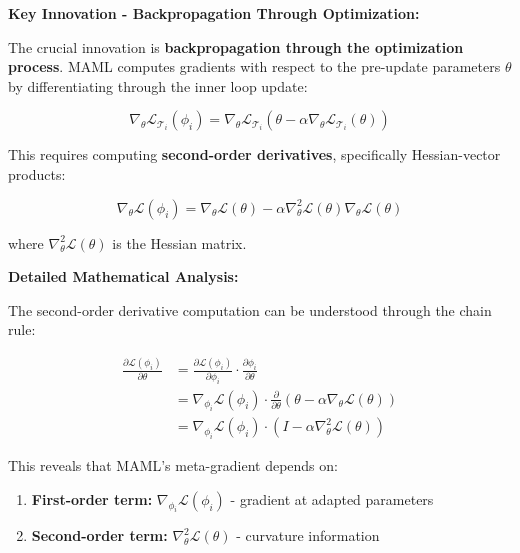 \documentclass[12pt]{article}
\newcommand{\ieee}[1]{\textcolor{IEEEBlue}{\textbf{#1}}}
\newcommand{\highlight}[1]{\textcolor{IEEERed}{\textbf{#1}}}
\begin{document}
{{			\ieee{Key Innovation - Backpropagation Through Optimization:}
			
			The crucial innovation is \highlight{backpropagation through the optimization process}. MAML computes gradients with respect to the pre-update parameters $\theta$ by differentiating through the inner loop update:
			
			\begin{equation}
			\nabla_\theta \mathcal{L}_{\mathcal{T}_i}(\phi_i) = \nabla_\theta \mathcal{L}_{\mathcal{T}_i}(\theta - \alpha \nabla_\theta \mathcal{L}_{\mathcal{T}_i}(\theta))
			\end{equation}
			
			This requires computing \textbf{second-order derivatives}, specifically Hessian-vector products:
			
			\begin{equation}
			\nabla_\theta \mathcal{L}(\phi_i) = \nabla_\theta \mathcal{L}(\theta) - \alpha \nabla^2_\theta \mathcal{L}(\theta) \nabla_\theta \mathcal{L}(\theta)
			\end{equation}
			
			where $\nabla^2_\theta \mathcal{L}(\theta)$ is the Hessian matrix.
			
			\ieee{Detailed Mathematical Analysis:}
			
			The second-order derivative computation can be understood through the chain rule:
			
			\begin{align}
			\frac{\partial \mathcal{L}(\phi_i)}{\partial \theta} &= \frac{\partial \mathcal{L}(\phi_i)}{\partial \phi_i} \cdot \frac{\partial \phi_i}{\partial \theta} \\
			&= \nabla_{\phi_i} \mathcal{L}(\phi_i) \cdot \frac{\partial}{\partial \theta} (\theta - \alpha \nabla_\theta \mathcal{L}(\theta)) \\
			&= \nabla_{\phi_i} \mathcal{L}(\phi_i) \cdot (I - \alpha \nabla^2_\theta \mathcal{L}(\theta))
			\end{align}
			
			This reveals that MAML's meta-gradient depends on:
			\begin{enumerate}
				\item \textbf{First-order term:} $\nabla_{\phi_i} \mathcal{L}(\phi_i)$ - gradient at adapted parameters
				\item \textbf{Second-order term:} $\nabla^2_\theta \mathcal{L}(\theta)$ - curvature information
			\end{enumerate}
			
}}
\end{document}
